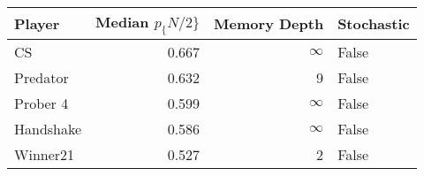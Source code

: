 \begin{tabular}{lrrl}
\toprule
    Player &  Median $p_\{N/2\}$ &  Memory Depth & Stochastic \\
\midrule
        CS &             0.667 &            \(\infty\) &      False \\
  Predator &             0.632 &             9 &      False \\
  Prober 4 &             0.599 &            \(\infty\) &      False \\
 Handshake &             0.586 &            \(\infty\) &      False \\
  Winner21 &             0.527 &             2 &      False \\
\bottomrule
\end{tabular}
